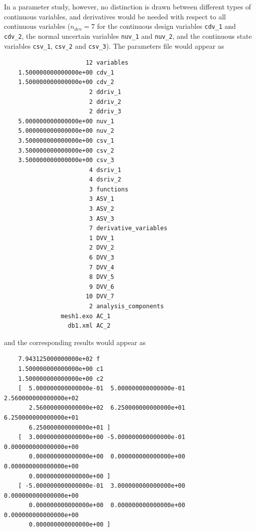 In a parameter study, however, no distinction is drawn between
different types of continuous variables, and derivatives would be
needed with respect to all continuous variables ($n_{dvv}=7$ for the
continuous design variables \texttt{cdv\_1} and \texttt{cdv\_2}, the
normal uncertain variables \texttt{nuv\_1} and \texttt{nuv\_2}, and
the continuous state variables \texttt{csv\_1}, \texttt{csv\_2} and
\texttt{csv\_3}).  The parameters file would appear as
\begin{small}
\begin{verbatim}
                       12 variables
    1.500000000000000e+00 cdv_1
    1.500000000000000e+00 cdv_2
                        2 ddriv_1
                        2 ddriv_2
                        2 ddriv_3
    5.000000000000000e+00 nuv_1
    5.000000000000000e+00 nuv_2
    3.500000000000000e+00 csv_1
    3.500000000000000e+00 csv_2
    3.500000000000000e+00 csv_3
                        4 dsriv_1
                        4 dsriv_2
                        3 functions
                        3 ASV_1
                        3 ASV_2
                        3 ASV_3
                        7 derivative_variables
                        1 DVV_1
                        2 DVV_2
                        6 DVV_3
                        7 DVV_4
                        8 DVV_5
                        9 DVV_6
                       10 DVV_7
                        2 analysis_components
                mesh1.exo AC_1
                  db1.xml AC_2
\end{verbatim}
\end{small}

and the corresponding results would appear as
\begin{small}
\begin{verbatim}
    7.943125000000000e+02 f
    1.500000000000000e+00 c1
    1.500000000000000e+00 c2
    [  5.000000000000000e-01  5.000000000000000e-01  2.560000000000000e+02
       2.560000000000000e+02  6.250000000000000e+01  6.250000000000000e+01
       6.250000000000000e+01 ]
    [  3.000000000000000e+00 -5.000000000000000e-01  0.000000000000000e+00
       0.000000000000000e+00  0.000000000000000e+00  0.000000000000000e+00
       0.000000000000000e+00 ]
    [ -5.000000000000000e-01  3.000000000000000e+00  0.000000000000000e+00
       0.000000000000000e+00  0.000000000000000e+00  0.000000000000000e+00
       0.000000000000000e+00 ]
\end{verbatim}
\end{small}
